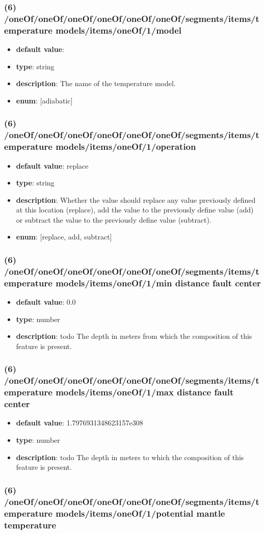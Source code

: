 \subsubsection{(6) /oneOf/oneOf/oneOf/oneOf/oneOf/oneOf/segments/items/temperature models/items/oneOf/1/model}
\begin{itemize}[leftmargin=6em]\item {\bf default value}: 
\item {\bf type}: string
\item {\bf description}: The name of the temperature model.
\item {\bf enum}: [adiabatic]\end{itemize}\subsubsection{(6) /oneOf/oneOf/oneOf/oneOf/oneOf/oneOf/segments/items/temperature models/items/oneOf/1/operation}
\begin{itemize}[leftmargin=6em]\item {\bf default value}: replace
\item {\bf type}: string
\item {\bf description}: Whether the value should replace any value previously defined at this location (replace), add the value to the previously define value (add) or subtract the value to the previously define value (subtract).
\item {\bf enum}: [replace, add, subtract]\end{itemize}\subsubsection{(6) /oneOf/oneOf/oneOf/oneOf/oneOf/oneOf/segments/items/temperature models/items/oneOf/1/min distance fault center}
\begin{itemize}[leftmargin=6em]\item {\bf default value}: 0.0
\item {\bf type}: number
\item {\bf description}: todo The depth in meters from which the composition of this feature is present.
\end{itemize}\subsubsection{(6) /oneOf/oneOf/oneOf/oneOf/oneOf/oneOf/segments/items/temperature models/items/oneOf/1/max distance fault center}
\begin{itemize}[leftmargin=6em]\item {\bf default value}: 1.7976931348623157e308
\item {\bf type}: number
\item {\bf description}: todo The depth in meters to which the composition of this feature is present.
\end{itemize}\subsubsection{(6) /oneOf/oneOf/oneOf/oneOf/oneOf/oneOf/segments/items/temperature models/items/oneOf/1/potential mantle temperature}
